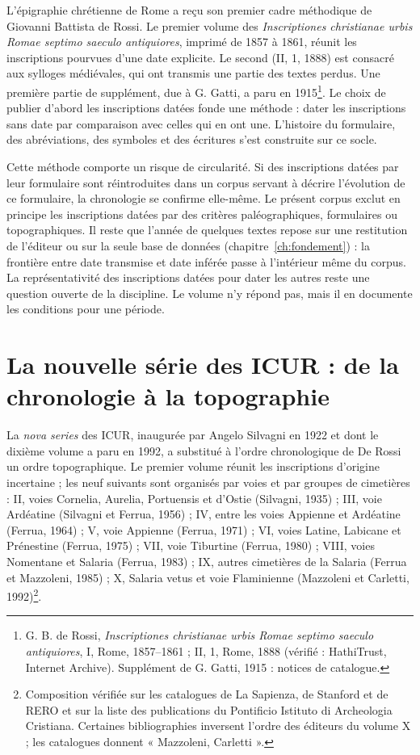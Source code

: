 L’épigraphie chrétienne de Rome a reçu son premier cadre méthodique de Giovanni Battista de Rossi. Le premier volume des \emph{Inscriptiones christianae urbis Romae septimo saeculo antiquiores}, imprimé de 1857 à 1861, réunit les inscriptions pourvues d’une date explicite. Le second (II, 1, 1888) est consacré aux sylloges médiévales, qui ont transmis une partie des textes perdus. Une première partie de supplément, due à G. Gatti, a paru en 1915\footnote{G. B. de Rossi, \emph{Inscriptiones christianae urbis Romae septimo saeculo antiquiores}, I, Rome, 1857–1861 ; II, 1, Rome, 1888 (vérifié : HathiTrust, Internet Archive). Supplément de G. Gatti, 1915 : notices de catalogue.}. Le choix de publier d’abord les inscriptions datées fonde une méthode : dater les inscriptions sans date par comparaison avec celles qui en ont une. L’histoire du formulaire, des abréviations, des symboles et des écritures s’est construite sur ce socle.

Cette méthode comporte un risque de circularité. Si des inscriptions datées par leur formulaire sont réintroduites dans un corpus servant à décrire l’évolution de ce formulaire, la chronologie se confirme elle-même. Le présent corpus exclut en principe les inscriptions datées par des critères paléographiques, formulaires ou topographiques. Il reste que l’année de quelques textes repose sur une restitution de l’éditeur ou sur la seule base de données (chapitre~\ref{ch:fondement}) : la frontière entre date transmise et date inférée passe à l’intérieur même du corpus. La représentativité des inscriptions datées pour dater les autres reste une question ouverte de la discipline. Le volume n’y répond pas, mais il en documente les conditions pour une période.

\section{La nouvelle série des ICUR : de la chronologie à la topographie}

La \emph{nova series} des ICUR, inaugurée par Angelo Silvagni en 1922 et dont le dixième volume a paru en 1992, a substitué à l’ordre chronologique de De Rossi un ordre topographique. Le premier volume réunit les inscriptions d’origine incertaine ; les neuf suivants sont organisés par voies et par groupes de cimetières : II, voies Cornelia, Aurelia, Portuensis et d’Ostie (Silvagni, 1935) ; III, voie Ardéatine (Silvagni et Ferrua, 1956) ; IV, entre les voies Appienne et Ardéatine (Ferrua, 1964) ; V, voie Appienne (Ferrua, 1971) ; VI, voies Latine, Labicane et Prénestine (Ferrua, 1975) ; VII, voie Tiburtine (Ferrua, 1980) ; VIII, voies Nomentane et Salaria (Ferrua, 1983) ; IX, autres cimetières de la Salaria (Ferrua et Mazzoleni, 1985) ; X, Salaria vetus et voie Flaminienne (Mazzoleni et Carletti, 1992)\footnote{Composition vérifiée sur les catalogues de La Sapienza, de Stanford et de RERO et sur la liste des publications du Pontificio Istituto di Archeologia Cristiana. Certaines bibliographies inversent l’ordre des éditeurs du volume X ; les catalogues donnent « Mazzoleni, Carletti ».}.

